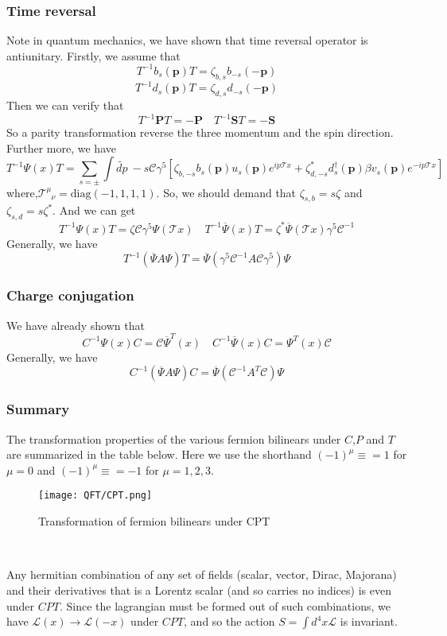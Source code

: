 \subsubsection{Time reversal}
Note in quantum mechanics, we have shown that time reversal operator is antiunitary. Firstly, we assume that
\[T^{-1} b_s(\bm{p}) T = \zeta_{b,s} b_{-s}(-\bm{p})\]
\[T^{-1} d_s(\bm{p}) T = \zeta_{d,s} d_{-s}(-\bm{p})\]
Then we can verify that
\[T^{-1} \bm{P} T = -\bm{P} \quad T^{-1} \bm{S} T = - \bm{S}\]
So a parity transformation reverse the three momentum and the spin direction. Further more, we have
\[T^{-1}\Psi(x)T = \sum_{s=\pm} \int \widetilde{dp} \: -s \mathcal{C} \gamma^5 \left [ \zeta_{b,-s} b_s(\bm{p}) u_s(\bm{p})e^{ip\mathcal{T}x} + \zeta_{d,-s}^* d^{\dagger}_s(\bm{p}) \beta v_s(\bm{p})e^{-ip\mathcal{T}x} \right ]\]
where,$\mathcal{T}^{\mu}_{\phantom{\mu}\nu} = \mathrm{diag}(-1,1,1,1)$. So, we should demand that $\zeta_{s,b} = s \zeta$ and $\zeta_{s,d} = s \zeta^*$. And we can get
\[T^{-1}\Psi(x)T = \zeta \mathcal{C} \gamma^5 \Psi(\mathcal{T}x) \quad T^{-1}\overline{\Psi}(x)T = \zeta^*  \overline{\Psi}(\mathcal{T}x)\gamma^5 \mathcal{C}^{-1} \]
Generally, we have
\[T^{-1} (\overline{\Psi} A \Psi) T = \overline{\Psi}(\gamma^5 \mathcal{C}^{-1} A \mathcal{C} \gamma^5)\Psi\]

\subsubsection{Charge conjugation}
\noindent
We have already shown that
\[C^{-1}\Psi(x)C = \mathcal{C} \overline{\Psi}^T(x) \quad C^{-1}\overline{\Psi}(x)C = \Psi^T(x)\mathcal{C}\]
Generally, we have
\[C^{-1}(\overline{\Psi} A \Psi )C = \overline{\Psi} (\mathcal{C}^{-1} A^T \mathcal{C})\Psi\]

\subsubsection{Summary}
The transformation properties of the various fermion bilinears under $C$,$P$ and $T$ are summarized in the table below. Here we use the shorthand $(-1)^{\mu} \equiv = 1$ for $\mu =0$ and $(-1)^{\mu} \equiv = -1$ for $\mu=1,2,3$.
\begin{figure}[!h]
\centering
\texttt{[image: QFT/CPT.png]}
\caption{Transformation of fermion bilinears under CPT}
\end{figure}\\
\begin{newthem}
Any hermitian combination of any set of fields (scalar, vector, Dirac, Majorana) and their derivatives that is a Lorentz scalar (and so carries no indices) is even under $CPT$. Since the lagrangian must be formed out of such combinations, we
have $\mathcal{L}(x) \to \mathcal{L}(-x)$ under $CPT$, and so the action $S = \int d^4x \mathcal{L}$ is invariant.
\end{newthem}

